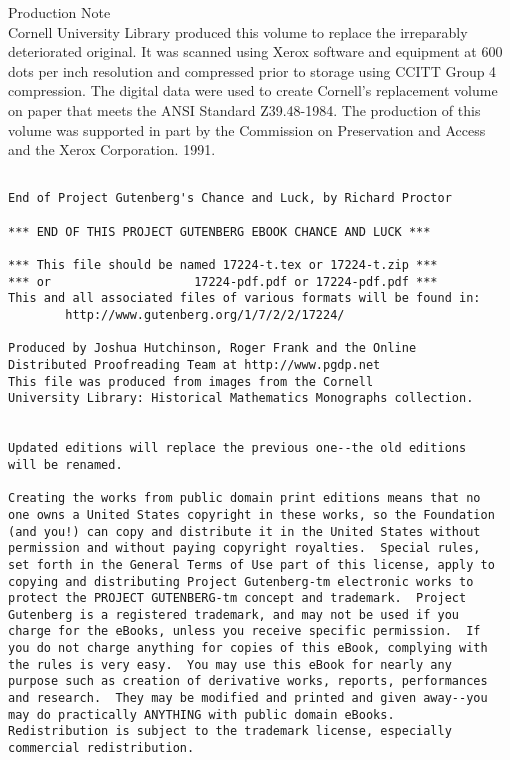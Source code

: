 \documentclass[letterpaper,12pt,oneside,openany]{memoir}
\begin{document}
\clearpage
\noindent
Production Note\\[5mm]
Cornell University Library produced this volume to replace
the irreparably deteriorated original. It was scanned using
Xerox software and equipment at 600 dots per inch resolution
and compressed prior to storage using CCITT Group 4
compression. The digital data were used to create Cornell's
replacement volume on paper that meets the ANSI Standard
Z39.48-1984. The production of this volume was supported in
part by the Commission on Preservation and Access and the
Xerox Corporation. 1991.
\newpage

\small
{}
\begin{verbatim}

End of Project Gutenberg's Chance and Luck, by Richard Proctor

*** END OF THIS PROJECT GUTENBERG EBOOK CHANCE AND LUCK ***

*** This file should be named 17224-t.tex or 17224-t.zip ***
*** or                    17224-pdf.pdf or 17224-pdf.pdf ***
This and all associated files of various formats will be found in:
        http://www.gutenberg.org/1/7/2/2/17224/

Produced by Joshua Hutchinson, Roger Frank and the Online
Distributed Proofreading Team at http://www.pgdp.net
This file was produced from images from the Cornell
University Library: Historical Mathematics Monographs collection.


Updated editions will replace the previous one--the old editions
will be renamed.

Creating the works from public domain print editions means that no
one owns a United States copyright in these works, so the Foundation
(and you!) can copy and distribute it in the United States without
permission and without paying copyright royalties.  Special rules,
set forth in the General Terms of Use part of this license, apply to
copying and distributing Project Gutenberg-tm electronic works to
protect the PROJECT GUTENBERG-tm concept and trademark.  Project
Gutenberg is a registered trademark, and may not be used if you
charge for the eBooks, unless you receive specific permission.  If
you do not charge anything for copies of this eBook, complying with
the rules is very easy.  You may use this eBook for nearly any
purpose such as creation of derivative works, reports, performances
and research.  They may be modified and printed and given away--you
may do practically ANYTHING with public domain eBooks.
Redistribution is subject to the trademark license, especially
commercial redistribution.




\end{verbatim}
\end{document}
